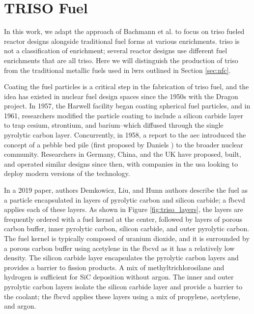\section{TRISO Fuel}
\label{sec:triso_fuel}

In this work, we adapt the approach of Bachmann et al.
\cite{bachmann_enrichment_2021} to focus on \gls{triso} fueled reactor designs
alongside traditional fuel forms at various enrichments. \gls{triso} is not a
classification of enrichment; several reactor designs use different fuel
enrichments that are all \gls{triso}. Here we will distinguish the
production of \gls{triso} from the traditional metallic fuels used in
\glspl{lwr} outlined in Section \ref{sec:nfc}.

Coating the fuel particles is a critical step in the fabrication of \gls{triso}
fuel, and the idea has existed in nuclear fuel design spaces since the 1950s
\cite{price_dragon_2012} with the Dragon project. In 1957, the Harwell facility
began coating spherical fuel particles, and in 1961, researchers modified the
particle coating to include a silicon carbide layer to trap cesium, strontium,
and barium--which diffused through the single pyrolytic carbon layer.
Concurrently, in 1958, a report to the \gls{aec} introduced the concept of a
pebble bed pile (first proposed by Daniels
\cite{f_b_daniels_suggestions_1944}) to the broader nuclear community.
Researchers in Germany, China, and the UK have proposed, built, and operated
similar designs since then, with companies in the \gls{usa} looking to deploy
modern versions of the technology.

In a 2019 paper, authors Demkowicz, Liu, and Hunn \cite{particle_review_2019}
authors describe the fuel as a particle encapsulated in layers of pyrolytic
carbon and silicon carbide; a \gls{fbcvd} applies each of these layers. As
shown in Figure \ref{fig:triso_layers}, the layers are frequently ordered with
a fuel kernel at the center, followed by layers of porous carbon buffer, inner
pyrolytic carbon, silicon carbide, and outer pyrolytic carbon. The fuel kernel
is typically composed of uranium dioxide, and it is surrounded by a porous
carbon buffer using acetylene in the \gls{fbcvd} as it has a relatively low
density. The silicon carbide layer encapsulates the pyrolytic carbon layers and
provides a barrier to fission products. A mix of methyltrichlorosilane and
hydrogen is sufficient for SiC deposition without argon. The inner and outer
pyrolytic carbon layers isolate the silicon carbide layer and provide a barrier
to the coolant; the \gls{fbcvd} applies these layers using a mix of propylene,
acetylene, and argon.

